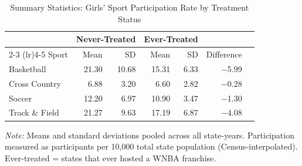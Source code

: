 \begin{table}[!htbp]
\centering
\caption{Summary Statistics: Girls' Sport Participation Rate by Treatment Status}
\label{tab:sumstat_tv}
\begin{threeparttable}
\fontsize{11}{13}\selectfont
\begin{tabular}{lrrrrrr}
\toprule
 & \multicolumn{2}{c}{Never-Treated} & \multicolumn{2}{c}{Ever-Treated} & \\
\cmidrule(lr){2-3} \cmidrule(lr){4-5}
Sport & Mean & SD & Mean & SD & Difference \\
\midrule
Basketball    & 21.30 & 10.68 & 15.31 & 6.33 & $-$5.99 \\
Cross Country &  6.88 &  3.20 &  6.60 & 2.82 & $-$0.28 \\
Soccer        & 12.20 &  6.97 & 10.90 & 3.47 & $-$1.30 \\
Track \& Field & 21.27 &  9.63 & 17.19 & 6.87 & $-$4.08 \\
\bottomrule
\end{tabular}
\begin{tablenotes}[flushleft]
\footnotesize
\item \textit{Note:} Means and standard deviations pooled across all state-years.
Participation measured as participants per 10,000 total state population
(Census-interpolated). Ever-treated = states that ever hosted a WNBA franchise.
\end{tablenotes}
\end{threeparttable}
\end{table}
